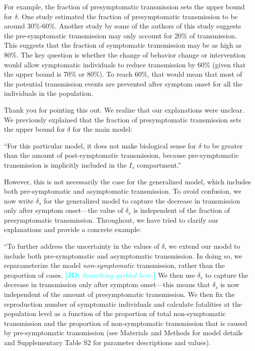 \documentclass[12pt]{article}
\newcommand{\revtext}{\textsf}
\newcommand{\comment}[3]{\textcolor{#1}{\textbf{[#2: }\textsl{#3}\textbf{]}}}
\newcommand{\jd}[1]{\comment{cyan}{JD}{#1}}
\begin{document}
\revtext{For example, the fraction of presymptomatic transmission sets the upper bound for $\delta$. One study estimated the fraction of presymptomatic transmission to be around 30\%-60\%. Another study by some of the authors of this study suggests the pre-symptomatic transmission may only account for 20\% of transmission. This suggests that the fraction of symptomatic transmission may be as high as 80\%. The key question is whether the change of behavior change or intervention would allow symptomatic individuals to reduce transmission by 60\% (given that the upper bound is 70\% or 80\%). To reach 60\%, that would mean that most of the potential transmission events are prevented after symptom onset for all the individuals in the population.}

Thank you for pointing this out. We realize that our explanations were unclear. We previously explained that the fraction of presymptomatic transmission sets the upper bound for $\delta$ for the main model:

``For this particular model, it does not make biological sense for $\delta$ to be greater than the amount of post-symptomatic transmission, because pre-symptomatic transmission is implicitly included in the $I_s$ compartment.''

However, this is not necessarily the case for the generalized model, which includes both pre-symptomatic and asymptomatic transmission. 
To avoid confusion, we now write $\delta_s$ for the generalized model to capture the decrease in transmission only after symptom onset---the value of $\delta_s$ is independent of the fraction of presymptomatic transmission.
Throughout, we have tried to clarify our explanations and provide a concrete example:

``To further address the uncertainty in the values of $\delta$, we extend our model to include both pre-symptomatic and asymptomatic transmission.
In doing so, we reparameterize the model \textit{non-symptomatic} transmission, rather than the proportion of cases.
\jd{Something garbled here.}
We then use $\delta_s$ to capture the decrease in transmission only after symptom onset---this means that $\delta_s$ is now independent of the amount of presymptomatic transmission.
We then fix the reproduction number of symptomatic individuals and calculate fatalities at the population level as a function of the proportion of total non-symptomatic transmission and the proportion of non-symptomatic transmission that is caused by pre-symptomatic transmission (see Materials and Methods for model details and Supplementary Table S2 for parameter descriptions and values).
\end{document}
